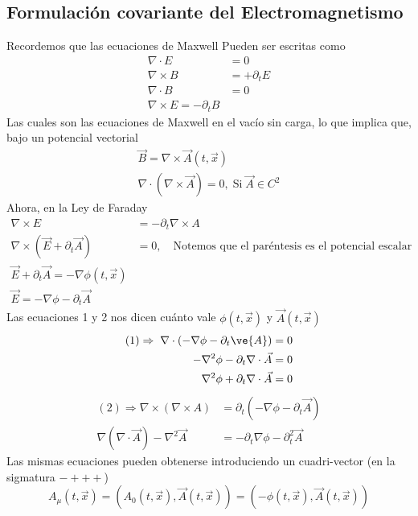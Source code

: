 \documentclass[../main.tex]{subfiles}
\begin{document}
\subsection{Formulación covariante del Electromagnetismo}
Recordemos que las ecuaciones de Maxwell Pueden ser escritas como
\begin{align}
  \nabla \cdot E & = 0 \\
  \nabla \times B & = +\partial_t E \\
  \nabla \cdot B & = 0 \\
  \nabla \times E = -\partial_t B
\end{align}
Las cuales son las ecuaciones de Maxwell en el vacío sin carga, lo que implica que, bajo un potencial vectorial
\begin{align*}
  \vec{B} = \nabla \times \vec{A}(t,\vec{x}) \\
  \nabla \cdot (\nabla \times \vec{A}) = 0, \; \text{Si}\; \vec{A}\in C^2
\end{align*}
Ahora, en la Ley de Faraday
\begin{align*}
  \nabla \times E & = -\partial_t \nabla \times A \\
  \nabla \times ( \vec{E} +\partial_t \vec{A} ) & = 0, \quad \text{Notemos que el paréntesis es el potencial escalar} \\
  \vec{E} + \partial_t \vec{A} = -\nabla \phi(t,\vec{x}) \\
  \vec{E} = -\nabla \phi - \partial_t\vec{A}
\end{align*}
Las ecuaciones 1 y 2 nos dicen cuánto vale $\phi(t,\vec{x})$ y $\vec{A}(t,\vec{x})$ 
\begin{align*}
  (1)\Rightarrow \; \nabla \cdot (-\nabla\phi - \partial_t\ve{A}) & = 0 \\
  -\nabla^2\phi - \partial_t\nabla \cdot \vec{A} & = 0 \\
  \nabla^2\phi + \partial_t\nabla \cdot \vec{A} & = 0
\end{align*}
\begin{align*}
  (2) \Rightarrow \nabla \times (\nabla \times A) & = \partial_t (-\nabla \phi - \partial_t \vec{A}) \\
  \nabla (\nabla \cdot \vec{A}) - \nabla^2\vec{A} & = -\partial_t\nabla\phi - \partial^2_t \vec{A}
\end{align*}
Las mismas ecuaciones pueden obtenerse introduciendo un cuadri-vector (en la sigmatura $-+++$)
\begin{equation}
  A_\mu(t,\vec{x}) = (A_0(t,\vec{x}),\vec{A}(t,\vec{x})) = (-\phi(t,\vec{x}),\vec{A}(t,\vec{x}))
 \end{equation}
\end{document}

